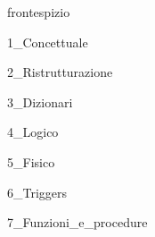 \documentclass{article}
\newcommand{\paginavuota}{\newpage\null\thispagestyle{empty}\newpage}
\begin{document}
{frontespizio} %

\paginavuota

\newpage

\tableofcontents   %

\newpage

{1_Concettuale} %

\newpage

{2_Ristrutturazione}

\newpage

{3_Dizionari}

\newpage

{4_Logico}

\newpage

{5_Fisico}

\newpage

{6_Triggers}

\newpage

{7_Funzioni_e_procedure}
\end{document}
